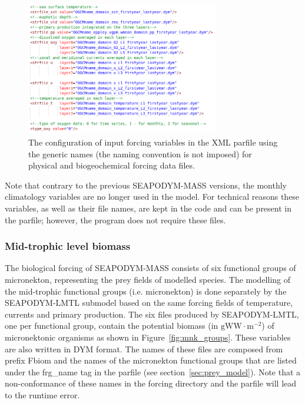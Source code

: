 \begin{figure}[t]
   \centering
   \includegraphics[width=0.75\textwidth]{chapter3/figs/forcing_data.png}
   \caption{The configuration of input forcing variables in the XML parfile using the generic names (the naming convention is not imposed) for physical and biogeochemical forcing data files.}
   \label{fig:physical_biogeochemical_parfile}
 \end{figure}

Note that contrary to the previous SEAPODYM-MASS versions, the monthly climatology variables are no longer used in the model. For technical reasons these variables, as well as their file names, are kept in the code and can be present in the parfile; however, the program does not require these files. 

\subsubsection{Mid-trophic level biomass}
\label{sec:mtl}

The biological forcing of SEAPODYM-MASS consists of six functional groups of micronekton, representing the prey fields of modelled species. The modelling of the mid-trophic functional groups (i.e. micronekton) is done separately by the SEAPODYM-LMTL submodel based on the same forcing fields of temperature, currents and primary production. The six files produced by SEAPODYM-LMTL, one per functional group, contain the potential biomass (in $\text{gWW}\cdot\text{m}^{-2}$) of micronektonic organisms as shown in Figure~\ref{fig:mnk_groups}. These variables are also written in DYM format. The names of these files are composed from prefix {\ttfamily Fbiom} and the names of the micronekton functional groups that are listed under the {\ttfamily frg\_name} tag in the parfile (see section~\ref{sec:prey_model}). Note that a non-conformance of these names in the forcing directory and the parfile will lead to the runtime error.  


